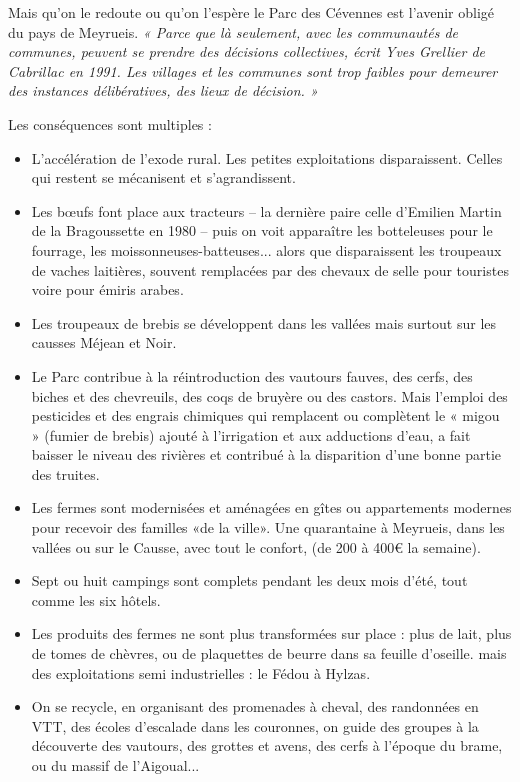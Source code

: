 Mais qu’on le redoute ou qu’on l’espère le Parc des Cévennes est l’avenir obligé du pays de
Meyrueis. \emph{« Parce que là seulement, avec les communautés de communes, peuvent se prendre des décisions
collectives, écrit Yves Grellier de Cabrillac en 1991. Les villages et les communes sont trop faibles pour
demeurer des instances délibératives, des lieux de décision. »}

Les conséquences sont multiples :

\begin{itemize}
    \item L’accélération de l’exode rural. Les petites exploitations disparaissent. Celles qui
    restent se mécanisent et s’agrandissent.

    \item Les bœufs font place aux tracteurs -- la dernière paire celle d’Emilien Martin de la
    Bragoussette en 1980 -- puis on voit apparaître les botteleuses pour le fourrage, les
    moissonneuses-batteuses... alors que disparaissent les troupeaux de vaches laitières,
    souvent remplacées par des chevaux de selle pour touristes voire pour émiris arabes.

    \item Les troupeaux de brebis se développent dans les vallées mais surtout sur les causses
    Méjean et Noir.

    \item Le Parc contribue à la réintroduction des vautours fauves, des cerfs, des biches et des
    chevreuils, des coqs de bruyère ou des castors. Mais l’emploi des pesticides et des
    engrais chimiques qui remplacent ou complètent le « migou » (fumier de brebis)
    ajouté à l’irrigation et aux adductions d’eau, a fait baisser le niveau des rivières et
    contribué à la disparition d’une bonne partie des truites.

    \item Les fermes sont modernisées et aménagées en gîtes ou appartements modernes pour
    recevoir des familles «de la ville». Une quarantaine à Meyrueis, dans les vallées ou sur
    le Causse, avec tout le confort, (de 200 à 400€ la semaine).

    \item Sept ou huit campings sont complets pendant les deux mois d’été, tout comme les six
    hôtels.

    \item Les produits des fermes ne sont plus transformées sur place : plus de lait, plus de
    tomes de chèvres, ou de plaquettes de beurre dans sa feuille d’oseille. mais des
    exploitations semi industrielles : le Fédou à Hylzas.

    \item On se recycle, en organisant des promenades à cheval, des randonnées en VTT, des
    écoles d’escalade dans les couronnes, on guide des groupes à la découverte des
    vautours, des grottes et avens, des cerfs à l’époque du brame, ou du massif de
    l’Aigoual...
\end{itemize}

